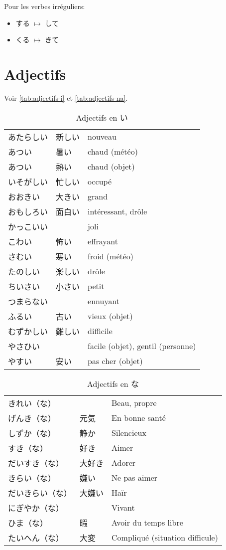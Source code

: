 \documentclass[a4paper,10pt,french,openany]{memoir}
\begin{document}
Pour les verbes irréguliers:
\begin{itemize}
 \item する $\mapsto$ して
 \item くる $\mapsto$ きて
\end{itemize}

\section{Adjectifs}

Voir \autoref{tab:adjectifs-i} et \autoref{tab:adjectifs-na}.

\begin{table}[h]
 \centering
 \begin{tabular}{lll}
  あたらしい & 新しい & nouveau \\
  あつい & 暑い & chaud (météo) \\
  あつい & 熱い & chaud (objet) \\
  いそがしい & 忙しい & occupé \\
  おおきい & 大きい & grand \\
  おもしろい & 面白い & intéressant, drôle \\
  かっこいい & & joli \\
  こわい & 怖い & effrayant \\
  さむい & 寒い & froid (météo) \\
  たのしい & 楽しい & drôle \\
  ちいさい & 小さい & petit \\
  つまらない & & ennuyant \\
  ふるい & 古い & vieux (objet) \\
  むずかしい & 難しい & difficile \\
  やさひい & & facile (objet), gentil (personne) \\
  やすい & 安い & pas cher (objet) \\
 \end{tabular}
 \caption{Adjectifs en い}
 \label{tab:adjectifs-i}
\end{table}

\begin{table}[h]
 \centering
 \begin{tabular}{lll}
  きれい（な） & & Beau, propre \\
  げんき（な） & 元気 & En bonne santé \\
  しずか（な） & 静か & Silencieux \\
  すき（な） & 好き & Aimer \\
  だいすき（な） & 大好き & Adorer \\
  きらい（な） & 嫌い & Ne pas aimer \\
  だいきらい（な） & 大嫌い & Haïr \\
  にぎやか（な） & & Vivant \\
  ひま（な） & 暇 & Avoir du temps libre \\
  たいへん（な） & 大変 & Compliqué (situation difficule) \\
 \end{tabular}
 \caption{Adjectifs en な}
 \label{tab:adjectifs-na}
\end{table}
\end{document}
